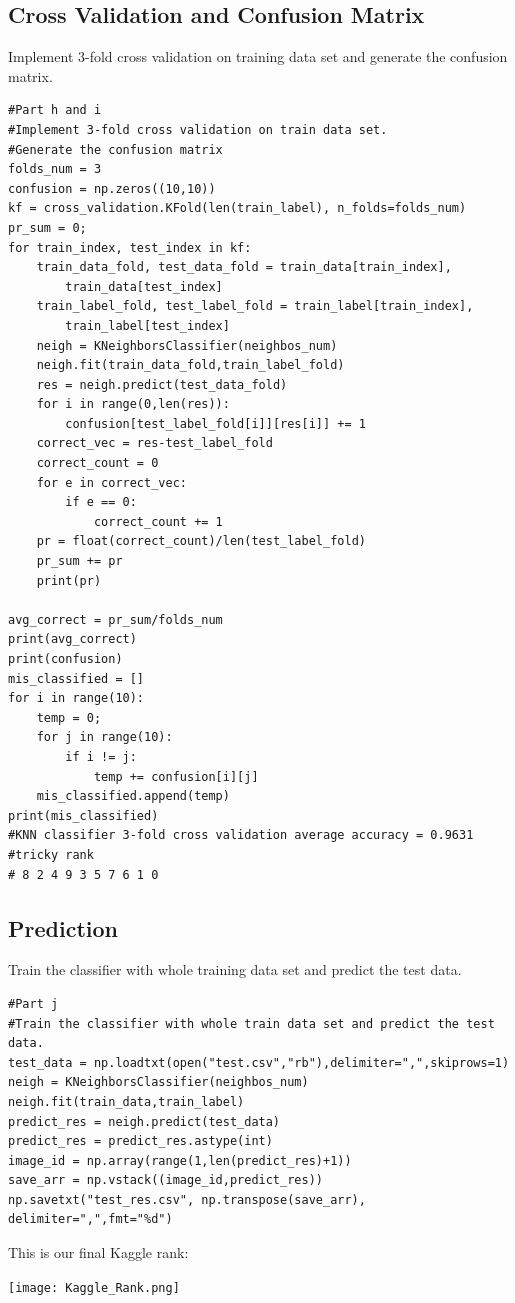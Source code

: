 \documentclass[a4paper]{article}
\begin{document}
\subsection*{Cross Validation and Confusion Matrix}
Implement 3-fold cross validation on training data set and generate the confusion matrix.

\begin{lstlisting}
#Part h and i
#Implement 3-fold cross validation on train data set.
#Generate the confusion matrix
folds_num = 3
confusion = np.zeros((10,10)) 
kf = cross_validation.KFold(len(train_label), n_folds=folds_num)
pr_sum = 0;
for train_index, test_index in kf:
    train_data_fold, test_data_fold = train_data[train_index], 
    	train_data[test_index]
    train_label_fold, test_label_fold = train_label[train_index], 
    	train_label[test_index]
    neigh = KNeighborsClassifier(neighbos_num)
    neigh.fit(train_data_fold,train_label_fold)
    res = neigh.predict(test_data_fold)
    for i in range(0,len(res)):
        confusion[test_label_fold[i]][res[i]] += 1
    correct_vec = res-test_label_fold
    correct_count = 0
    for e in correct_vec:
        if e == 0:
            correct_count += 1
    pr = float(correct_count)/len(test_label_fold)
    pr_sum += pr
    print(pr)

avg_correct = pr_sum/folds_num
print(avg_correct)
print(confusion)
mis_classified = []
for i in range(10):
    temp = 0;
    for j in range(10):
        if i != j:
            temp += confusion[i][j]
    mis_classified.append(temp)
print(mis_classified)
#KNN classifier 3-fold cross validation average accuracy = 0.9631
#tricky rank
# 8 2 4 9 3 5 7 6 1 0
\end{lstlisting}

\subsection*{Prediction}
Train the classifier with whole training data set and predict the test data.
\begin{lstlisting}
#Part j
#Train the classifier with whole train data set and predict the test data.
test_data = np.loadtxt(open("test.csv","rb"),delimiter=",",skiprows=1)
neigh = KNeighborsClassifier(neighbos_num)
neigh.fit(train_data,train_label)
predict_res = neigh.predict(test_data)
predict_res = predict_res.astype(int)
image_id = np.array(range(1,len(predict_res)+1))
save_arr = np.vstack((image_id,predict_res))
np.savetxt("test_res.csv", np.transpose(save_arr), delimiter=",",fmt="%d")
\end{lstlisting}
This is our final Kaggle rank:
\begin{center}
\texttt{[image: Kaggle\_Rank.png]}
\end{center}
\end{document}
